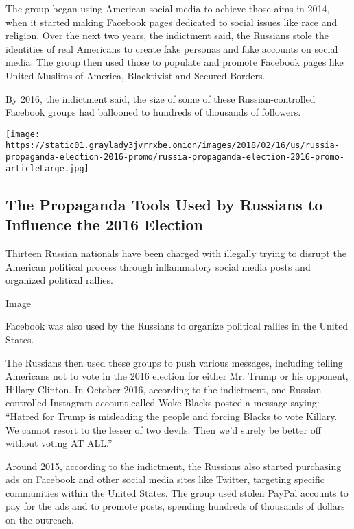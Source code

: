 The group began using American social media to achieve those aims in
2014, when it started making Facebook pages dedicated to social issues
like race and religion. Over the next two years, the indictment said,
the Russians stole the identities of real Americans to create fake
personas and fake accounts on social media. The group then used those to
populate and promote Facebook pages like United Muslims of America,
Blacktivist and Secured Borders.

By 2016, the indictment said, the size of some of these
Russian-controlled Facebook groups had ballooned to hundreds of
thousands of followers.

\href{https://www.nytimes3xbfgragh.onion/interactive/2018/02/16/us/politics/russia-propaganda-election-2016.html}{}

\texttt{[image: https://static01.graylady3jvrrxbe.onion/images/2018/02/16/us/russia-propaganda-election-2016-promo/russia-propaganda-election-2016-promo-articleLarge.jpg]}

\hypertarget{the-propaganda-tools-used-by-russians-to-influence-the-2016-election}{%
\subsection{The Propaganda Tools Used by Russians to Influence the 2016
Election}\label{the-propaganda-tools-used-by-russians-to-influence-the-2016-election}}

Thirteen Russian nationals have been charged with illegally trying to
disrupt the American political process through inflammatory social media
posts and organized political rallies.

Image

Facebook was also used by the Russians to organize political rallies in
the United States.

The Russians then used these groups to push various messages, including
telling Americans not to vote in the 2016 election for either Mr. Trump
or his opponent, Hillary Clinton. In October 2016, according to the
indictment, one Russian-controlled Instagram account called Woke Blacks
posted a message saying: ``Hatred for Trump is misleading the people and
forcing Blacks to vote Killary. We cannot resort to the lesser of two
devils. Then we'd surely be better off without voting AT ALL.''

Around 2015, according to the indictment, the Russians also started
purchasing ads on Facebook and other social media sites like Twitter,
targeting specific communities within the United States. The group used
stolen PayPal accounts to pay for the ads and to promote posts, spending
hundreds of thousands of dollars on the outreach.

